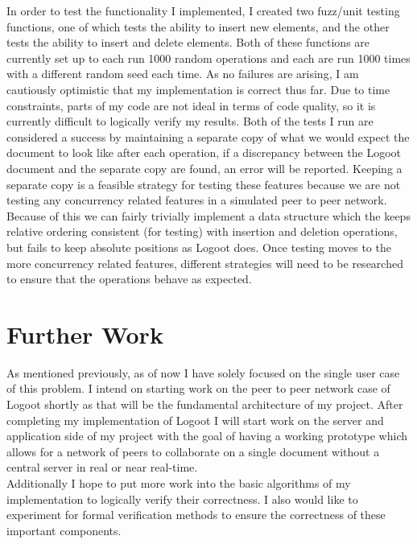 \documentclass[11pt]{article}
\begin{document}
In order to test the functionality I implemented, I created two fuzz/unit testing functions, one of which tests the ability to insert new elements, and the other tests the ability to insert and delete elements. Both of these functions are currently set up to each run 1000 random operations and each are run 1000 times with a different random seed each time. As no failures are arising, I am cautiously optimistic that my implementation is correct thus far. Due to time constraints, parts of my code are not ideal in terms of code quality, so it is currently difficult to logically verify my results. Both of the tests I run are considered a success by maintaining a separate copy of what we would expect the document to look like after each operation, if a discrepancy between the Logoot document and the separate copy are found, an error will be reported. Keeping a separate copy is a feasible strategy for testing these features because we are not testing any concurrency related features in a simulated peer to peer network. Because of this we can fairly trivially implement a data structure which the keeps relative ordering consistent (for testing) with insertion and deletion operations, but fails to keep absolute positions as Logoot does. Once testing moves to the more concurrency related features, different strategies will need to be researched to ensure that the operations behave as expected.

\pagebreak

\section{Further Work}
As mentioned previously, as of now I have solely focused on the single user case of this problem. I intend on starting work on the peer to peer network case of Logoot shortly as that will be the fundamental architecture of my project. After completing my implementation of Logoot I will start work on the server and application side of my project with the goal of having a working prototype which allows for a network of peers to collaborate on a single document without a central server in real or near real-time.\\

Additionally I hope to put more work into the basic algorithms of my implementation to logically verify their correctness. I also would like to experiment for formal verification methods to ensure the correctness of these important components.
\end{document}
